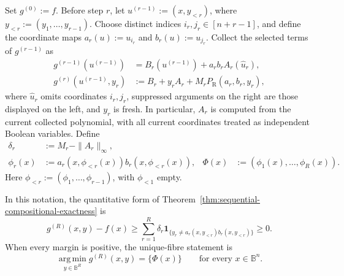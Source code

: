 \documentclass[a4paper,onecolumn,11pt,unpublished]{quantumarticle}
\theoremstyle{remark}
\begin{document}
Set \(g^{(0)}:=f\).  Before step \(r\), let
\(u^{(r-1)}:=(x,y_{<r})\), where \(y_{<r}:=(y_1,\ldots,y_{r-1})\).
Choose distinct indices \(i_r,j_r\in[n+r-1]\), and define the coordinate
maps \(a_r(u):=u_{i_r}\) and \(b_r(u):=u_{j_r}\).  Collect the selected terms
of \(g^{(r-1)}\) as
\begin{equation}
  \begin{aligned}
    g^{(r-1)}(u^{(r-1)})
    &=B_r(u^{(r-1)})+a_rb_rA_r(\widehat u_r),\\
    g^{(r)}(u^{(r-1)},y_r)
    &:=B_r+y_rA_r+M_rP_{\mathrm R}(a_r,b_r,y_r),
  \end{aligned}
  \label{eq:sequential-substitution}
\end{equation}
where \(\widehat u_r\) omits coordinates \(i_r,j_r\), suppressed arguments on
the right are those displayed on the left, and \(y_r\) is fresh. In
particular, \(A_r\) is computed from the current collected polynomial, with all
current coordinates treated as independent Boolean variables.  Define
\begin{equation}
  \begin{aligned}
    \delta_r&:=M_r-\|A_r\|_\infty,\\
    \phi_r(x)&:=a_r(x,\phi_{<r}(x))b_r(x,\phi_{<r}(x)),
    &\Phi(x)&:=(\phi_1(x),\ldots,\phi_R(x)).
  \end{aligned}
  \label{eq:sequential-margin-and-lift}
\end{equation}
Here \(\phi_{<r}:=(\phi_1,\ldots,\phi_{r-1})\), with \(\phi_{<1}\) empty.


In this notation, the quantitative form of
Theorem~\ref{thm:sequential-compositional-exactness} is
\begin{equation}
  g^{(R)}(x,y)-f(x)
  \geq
  \sum_{r=1}^R\delta_r
  \mathbf 1_{\{y_r\neq
  a_r(x,y_{<r})b_r(x,y_{<r})\}}\geq0.
  \label{eq:compositional-gap}
\end{equation}
When every margin is positive, the unique-fibre statement is
\begin{equation}
  \operatorname*{arg\,min}_{y\in\mathbb B^R}g^{(R)}(x,y)
  =\{\Phi(x)\}
  \qquad\text{for every }x\in\mathbb B^n.
  \label{eq:strict-fibre-uniqueness}
\end{equation}
\end{document}
